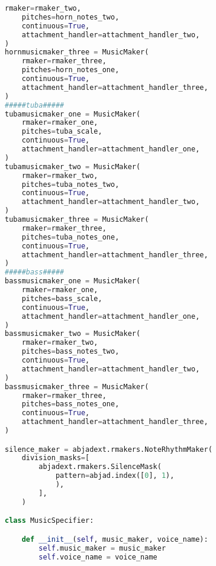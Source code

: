 \begin{lstlisting}[language=Python, caption=Tianshu Segment\_I]
    rmaker=rmaker_two,
    pitches=horn_notes_two,
    continuous=True,
    attachment_handler=attachment_handler_two,
)
hornmusicmaker_three = MusicMaker(
    rmaker=rmaker_three,
    pitches=horn_notes_one,
    continuous=True,
    attachment_handler=attachment_handler_three,
)
#####tuba#####
tubamusicmaker_one = MusicMaker(
    rmaker=rmaker_one,
    pitches=tuba_scale,
    continuous=True,
    attachment_handler=attachment_handler_one,
)
tubamusicmaker_two = MusicMaker(
    rmaker=rmaker_two,
    pitches=tuba_notes_two,
    continuous=True,
    attachment_handler=attachment_handler_two,
)
tubamusicmaker_three = MusicMaker(
    rmaker=rmaker_three,
    pitches=tuba_notes_one,
    continuous=True,
    attachment_handler=attachment_handler_three,
)
#####bass#####
bassmusicmaker_one = MusicMaker(
    rmaker=rmaker_one,
    pitches=bass_scale,
    continuous=True,
    attachment_handler=attachment_handler_one,
)
bassmusicmaker_two = MusicMaker(
    rmaker=rmaker_two,
    pitches=bass_notes_two,
    continuous=True,
    attachment_handler=attachment_handler_two,
)
bassmusicmaker_three = MusicMaker(
    rmaker=rmaker_three,
    pitches=bass_notes_one,
    continuous=True,
    attachment_handler=attachment_handler_three,
)

silence_maker = abjadext.rmakers.NoteRhythmMaker(
    division_masks=[
        abjadext.rmakers.SilenceMask(
            pattern=abjad.index([0], 1),
            ),
        ],
    )

class MusicSpecifier:

    def __init__(self, music_maker, voice_name):
        self.music_maker = music_maker
        self.voice_name = voice_name


\end{lstlisting}
